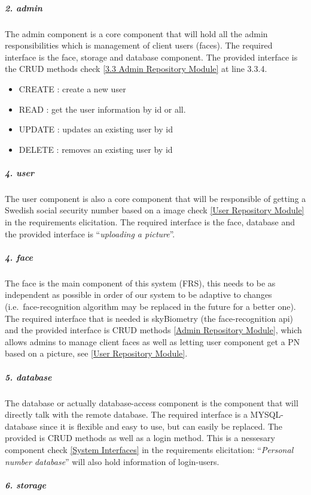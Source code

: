\documentclass[a4paper,11pt]{article}
\begin{document}
\subparagraph{2. admin}\label{admin}

The admin component is a core component that will hold all the admin
responsibilities which is management of client users (faces). The
required interface is the face, storage and database component. The
provided interface is the CRUD methods check \ref{3.3 Admin Repository Module} at line 3.3.4.

\begin{itemize}
\item
  CREATE : create a new user
\item
  READ : get the user information by id or all.
\item
  UPDATE : updates an existing user by id
\item
  DELETE : removes an existing user by id
\end{itemize}

\subparagraph{4. user}\label{user}

The user component is also a core component that will be responsible of
getting a Swedish social security number based on a image check \ref{User Repository Module} in the requirements elicitation. The required
interface is the face, database and the provided interface is
``\emph{uploading a picture}''. 

\subparagraph{4. face}\label{face}

The face is the main component of this system (FRS), this needs to be as
independent as possible in order of our system to be adaptive to changes
(i.e.~face-recognition algorithm may be replaced in the future for a
better one). The required interface that is needed is skyBiometry (the
face-recognition api) and the provided interface is CRUD methods \ref{Admin Repository Module}, which
allows admins to manage client faces as well as letting user component
get a PN based on a picture, see \ref{User Repository Module}.

\subparagraph{5. database}\label{database}

The database or actually database-access component is the component that
will directly talk with the remote database. The required interface is a
MYSQL-database since it is flexible and easy to use, but can easily be replaced. The provided is CRUD methods as well as a login method. This is a nessesary component check \ref{System Interfaces} in the requirements elicitation: ``\emph{Personal number database}'' will also hold information of login-users.

\subparagraph{6. storage}\label{storage}
\end{document}
